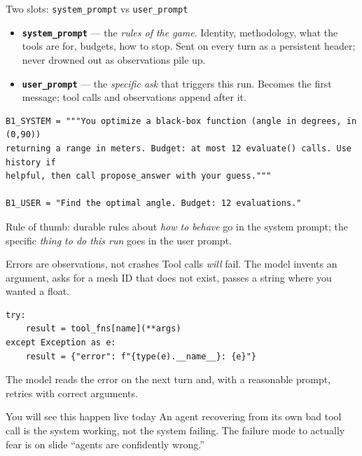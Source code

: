 \documentclass[aspectratio=169,10pt]{beamer}
\newcommand{\code}[1]{\texttt{\small #1}}
\newcommand{\hl}[1]{\textcolor{accent}{\textbf{#1}}}
\begin{document}
\begin{frame}[fragile]{Two slots: \code{system\_prompt} vs \code{user\_prompt}}
\begin{itemize}\itemsep6pt
  \item \hl{\code{system\_prompt}} --- the \emph{rules of the game}. Identity,
        methodology, what the tools are for, budgets, how to stop. Sent on every
        turn as a persistent header; never drowned out as observations pile up.
  \item \hl{\code{user\_prompt}} --- the \emph{specific ask} that triggers this
        run. Becomes the first message; tool calls and observations append after it.
\end{itemize}

\vspace{0.5em}
\begin{lstlisting}
B1_SYSTEM = """You optimize a black-box function (angle in degrees, in (0,90))
returning a range in meters. Budget: at most 12 evaluate() calls. Use history if
helpful, then call propose_answer with your guess."""

B1_USER = "Find the optimal angle. Budget: 12 evaluations."
\end{lstlisting}

\vspace{0.5em}
Rule of thumb: durable rules about \emph{how to behave} go in the system prompt;
the specific \emph{thing to do this run} goes in the user prompt.
\end{frame}

\begin{frame}[fragile]{Errors are observations, not crashes}
Tool calls \emph{will} fail. The model invents an argument, asks for a mesh ID
that does not exist, passes a string where you wanted a float.

\begin{lstlisting}
try:
    result = tool_fns[name](**args)
except Exception as e:
    result = {"error": f"{type(e).__name__}: {e}"}
\end{lstlisting}

\vspace{0.5em}
The model reads the error on the next turn and, with a reasonable prompt,
retries with correct arguments.

\vfill
\begin{block}{You will see this happen live today}
An agent recovering from its own bad tool call is the system working, not the
system failing. The failure mode to actually fear is on slide
``agents are confidently wrong.''
\end{block}
\end{frame}
\end{document}
